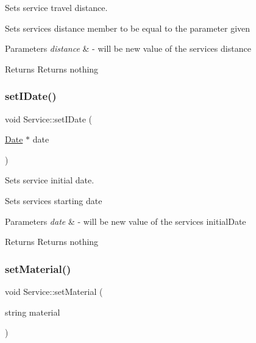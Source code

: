 Sets service travel distance. 

Sets service\textquotesingle{}s distance member to be equal to the parameter given 
\begin{DoxyParams}{Parameters}
{\em distance} & -\/ will be new value of the service\textquotesingle{}s distance \\
\hline
\end{DoxyParams}
\begin{DoxyReturn}{Returns}
Returns nothing 
\end{DoxyReturn}
\mbox{\label{class_service_ac4635d11b13279a4ef84b1c6378639d4}} 
\subsubsection{\texorpdfstring{set\+I\+Date()}{setIDate()}}
{\footnotesize\ttfamily void Service\+::set\+I\+Date (\begin{DoxyParamCaption}\item[{\hyperlink{class_date}{Date} $\ast$}]{date }\end{DoxyParamCaption})}



Sets service initial date. 

Sets service\textquotesingle{}s starting date 
\begin{DoxyParams}{Parameters}
{\em date} & -\/ will be new value of the service\textquotesingle{}s initial\+Date \\
\hline
\end{DoxyParams}
\begin{DoxyReturn}{Returns}
Returns nothing 
\end{DoxyReturn}
\mbox{\label{class_service_a9fcafc3bcbdc0b436860ee5626c69ce1}} 
\subsubsection{\texorpdfstring{set\+Material()}{setMaterial()}}
{\footnotesize\ttfamily void Service\+::set\+Material (\begin{DoxyParamCaption}\item[{string}]{material }\end{DoxyParamCaption})}



